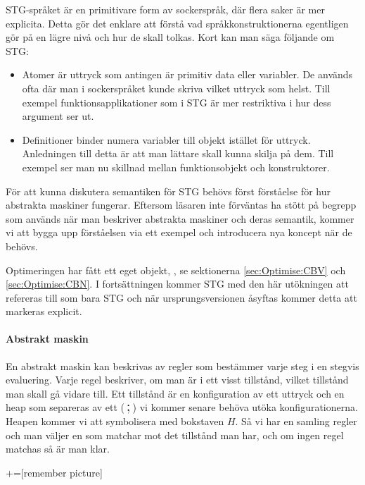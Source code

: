 \documentclass[../Core]{subfiles}
\begin{document}
STG-språket är en primitivare form av sockerspråk, där flera saker är mer explicita. 
Detta gör det enklare
att förstå vad språkkonstruktionerna egentligen gör på en lägre nivå och hur de skall tolkas. 
Kort kan man säga följande om STG:

\begin{itemize}
\item Atomer är uttryck som antingen är primitiv data eller variabler. De används ofta
    där man i sockerspråket kunde skriva vilket uttryck som helst. Till exempel funktionsapplikationer
    som i STG är mer restriktiva i hur dess argument ser ut.
\item Definitioner binder numera variabler till objekt istället för uttryck. Anledningen 
    till detta är att man lättare skall kunna skilja på dem. Till exempel ser man nu skillnad
    mellan funktionsobjekt och konstruktorer.
\end{itemize}



För att kunna diskutera semantiken för STG behövs först
förståelse för hur abstrakta maskiner fungerar. Eftersom läsaren inte förväntas
ha stött på begrepp som används när man beskriver abstrakta maskiner
och deras semantik, kommer vi att bygga upp förståelsen via ett exempel
och introducera nya koncept när de behövs. 

Optimeringen har fått ett eget objekt, , se sektionerna 
\ref{sec:Optimise:CBV} och \ref{sec:Optimise:CBN}. I fortsättningen kommer STG
med den här utökningen att refereras till som bara STG och när ursprungsversionen
åsyftas kommer detta att markeras explicit.

\paragraph{Abstrakt maskin}

En abstrakt maskin kan beskrivas av regler som bestämmer varje steg i en stegvis evaluering.
Varje regel beskriver, om man är i ett visst tillstånd, vilket tillstånd man skall gå vidare till.
Ett tillstånd är en konfiguration av ett uttryck och en heap som separeras av ett ($\,\text{\Large;}\,$) vi kommer senare behöva utöka konfigurationerna. Heapen kommer vi att symbolisera med bokstaven $H$.
Så vi har en samling regler och man väljer en som matchar mot det tillstånd man har, och om 
ingen regel matchas så är man klar.

+=[remember picture]
\everymath{\displaystyle}
\end{document}
